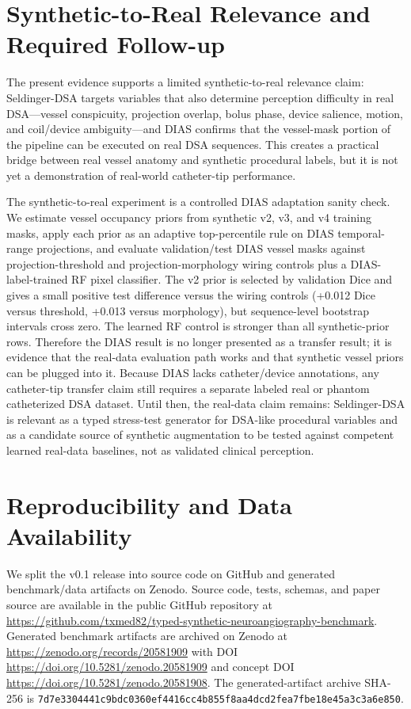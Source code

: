 \documentclass[10pt]{article}
\begin{document}
\section{Synthetic-to-Real Relevance and Required Follow-up}
The present evidence supports a limited synthetic-to-real relevance claim: Seldinger-DSA targets variables that also determine perception difficulty in real DSA---vessel conspicuity, projection overlap, bolus phase, device salience, motion, and coil/device ambiguity---and DIAS confirms that the vessel-mask portion of the pipeline can be executed on real DSA sequences. This creates a practical bridge between real vessel anatomy and synthetic procedural labels, but it is not yet a demonstration of real-world catheter-tip performance.

The synthetic-to-real experiment is a controlled DIAS adaptation sanity check. We estimate vessel occupancy priors from synthetic v2, v3, and v4 training masks, apply each prior as an adaptive top-percentile rule on DIAS temporal-range projections, and evaluate validation/test DIAS vessel masks against projection-threshold and projection-morphology wiring controls plus a DIAS-label-trained RF pixel classifier. The v2 prior is selected by validation Dice and gives a small positive test difference versus the wiring controls (+0.012 Dice versus threshold, +0.013 versus morphology), but sequence-level bootstrap intervals cross zero. The learned RF control is stronger than all synthetic-prior rows. Therefore the DIAS result is no longer presented as a transfer result; it is evidence that the real-data evaluation path works and that synthetic vessel priors can be plugged into it. Because DIAS lacks catheter/device annotations, any catheter-tip transfer claim still requires a separate labeled real or phantom catheterized DSA dataset. Until then, the real-data claim remains: Seldinger-DSA is relevant as a typed stress-test generator for DSA-like procedural variables and as a candidate source of synthetic augmentation to be tested against competent learned real-data baselines, not as validated clinical perception.

\section{Reproducibility and Data Availability}
We split the v0.1 release into source code on GitHub and generated benchmark/data artifacts on Zenodo. Source code, tests, schemas, and paper source are available in the public GitHub repository at \url{https://github.com/txmed82/typed-synthetic-neuroangiography-benchmark}. Generated benchmark artifacts are archived on Zenodo at \url{https://zenodo.org/records/20581909} with DOI \url{https://doi.org/10.5281/zenodo.20581909} and concept DOI \url{https://doi.org/10.5281/zenodo.20581908}. The generated-artifact archive SHA-256 is \texttt{7d7e3304441c9bdc0360ef4416cc4b855f8aa4dcd2fea7fbe18e45a3c3a6e850}.
\end{document}
